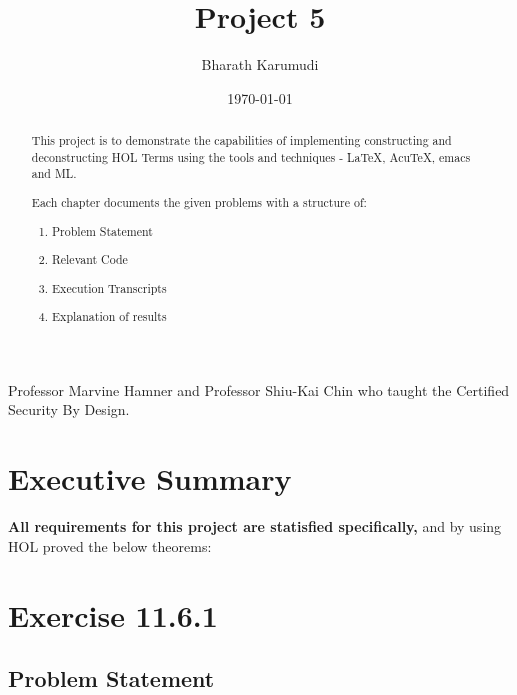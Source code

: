 \documentclass{report}
\title{Project 5}
\author{Bharath Karumudi}
\date{\today}
\begin{document}
 \lstset{language=ML}
 \maketitle{}

 \begin{abstract}
   This project is to demonstrate the capabilities of implementing
   constructing and deconstructing HOL Terms using the tools and
   techniques - \LaTeX{}, AcuTeX, emacs and ML. 

   Each chapter documents the given problems with a structure of:
   \begin{enumerate}
   \item Problem Statement
   \item Relevant Code
   \item Execution Transcripts
   \item Explanation of results
   \end{enumerate}

 \end{abstract}


 \begin{acknowledgments}
  Professor Marvine Hamner and Professor Shiu-Kai Chin who taught the
  Certified Security By Design.
 \end{acknowledgments}

 \tableofcontents{}

 \chapter{Executive Summary}
 \label{cha:executive-summary}

\textbf{All requirements for this project are statisfied specifically,}
 and by using HOL proved the below theorems:
\begin{quote}

\HOLexTypeTheoremsLENGTHXXAPP
\HOLexTypeTheoremsMapXXAPP

\HOLnexpTheoremsAddXXZero
\HOLnexpTheoremsAddXXSYM
\HOLnexpTheoremsSubXXZero
\HOLnexpTheoremsMultXXASSOC


\end{quote}



 \chapter{Exercise 11.6.1}
 \label{cha:exercise-11.6.1}
  
 \section{Problem Statement}
 \label{sec:problem-statement-1}
\end{document}
